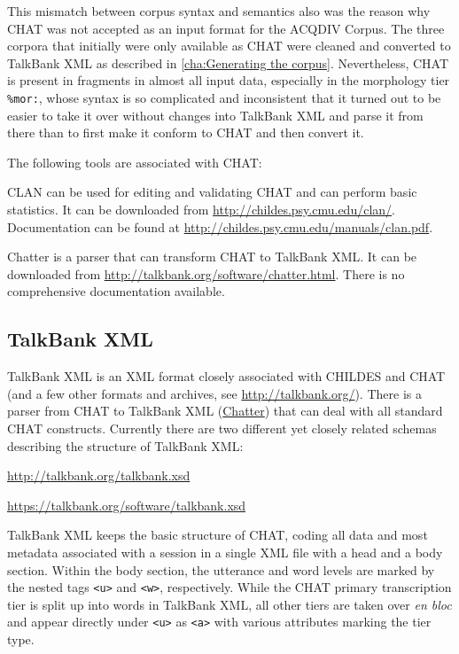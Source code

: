 \documentclass[a4paper, 11pt]{book}
\begin{document}
This mismatch between corpus syntax and semantics also was the reason why CHAT was not accepted as an input format for the ACQDIV Corpus. The three corpora that initially were only available as CHAT were cleaned and converted to TalkBank XML as described in \autoref{cha:Generating the corpus}. Nevertheless, CHAT is present in fragments in almost all input data, especially in the morphology tier \texttt{\%mor:}, whose syntax is so complicated and inconsistent that it turned out to be easier to take it over without changes into TalkBank XML and parse it from there than to first make it conform to CHAT and then convert it. 

The following tools are associated with CHAT: 

\begin{itemize*}
	\item CLAN can be used for editing and validating CHAT and can perform basic statistics. It can be downloaded from \url{http://childes.psy.cmu.edu/clan/}.
		Documentation can be found at \url{http://childes.psy.cmu.edu/manuals/clan.pdf}. 
	\item Chatter is a parser that can transform CHAT to TalkBank XML. It can be downloaded from \url{http://talkbank.org/software/chatter.html}. 
		There is no comprehensive documentation available. 
\end{itemize*}


\subsection{TalkBank XML}
\label{subsec:TalkBank XML}

TalkBank XML is an XML format closely associated with CHILDES and CHAT (and a few other formats and archives, see \url{http://talkbank.org/}). There is a parser from CHAT to TalkBank XML (\href{http://talkbank.org/software/chatter.html}{Chatter}) that can deal with all standard CHAT constructs. Currently there are two different yet closely related schemas describing the structure of TalkBank XML:

\begin{itemize*}
	\item \url{http://talkbank.org/talkbank.xsd}
	\item \url{https://talkbank.org/software/talkbank.xsd}
\end{itemize*}

TalkBank XML keeps the basic structure of CHAT, coding all data and most metadata associated with a session in a single XML file with a head and a body section. Within the body section, the utterance and word levels are marked by the nested tags \texttt{<u>} and \texttt{<w>}, respectively. While the CHAT primary transcription tier is split up into words in TalkBank XML, all other tiers are taken over \emph{en bloc} and appear directly under \texttt{<u>} as \texttt{<a>} with various attributes marking the tier type.
\end{document}
